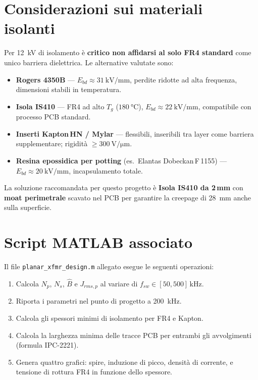 \documentclass[a4paper,11pt]{article}
\begin{document}
\section{Considerazioni sui materiali isolanti}

Per \SI{12}{\kilo\volt} di isolamento è \textbf{critico non affidarsi al solo FR4
standard} come unico barriera dielettrica. Le alternative valutate sono:

\begin{itemize}
  \item \textbf{Rogers 4350B} — $E_{bd} \approx \SI{31}{\kilo\volt\per\milli\metre}$,
        perdite ridotte ad alta frequenza, dimensioni stabili in temperatura.
  \item \textbf{Isola IS410} — FR4 ad alto $T_g$ ($\SI{180}{\celsius}$),
        $E_{bd} \approx \SI{22}{\kilo\volt\per\milli\metre}$, compatibile
        con processo PCB standard.
  \item \textbf{Inserti Kapton\,HN / Mylar} — flessibili, inseribili tra layer
        come barriera supplementare; rigidità $\geq \SI{300}{\volt\per\micro\metre}$.
  \item \textbf{Resina epossidica per potting} (es.\ Elantas Dobeckan\,F\,1155) —
        $E_{bd} \approx \SI{20}{\kilo\volt\per\milli\metre}$, incapsulamento totale.
\end{itemize}

La soluzione raccomandata per questo progetto è \textbf{Isola IS410 da 2\,mm}
con \textbf{moat perimetrale} scavato nel PCB per garantire la creepage di
\SI{28}{\milli\metre} anche sulla superficie.

\section{Script MATLAB associato}

Il file \texttt{planar\_xfmr\_design.m} allegato esegue le seguenti operazioni:
\begin{enumerate}
  \item Calcola $N_p$, $N_s$, $\hat{B}$ e $J_{rms,p}$ al variare di
        $f_{sw} \in [50, 500]\,\mathrm{kHz}$.
  \item Riporta i parametri nel punto di progetto a \SI{200}{\kilo\hertz}.
  \item Calcola gli spessori minimi di isolamento per FR4 e Kapton.
  \item Calcola la larghezza minima delle tracce PCB per entrambi gli
        avvolgimenti (formula IPC-2221).
  \item Genera quattro grafici: spire, induzione di picco, densità di corrente,
        e tensione di rottura FR4 in funzione dello spessore.
\end{enumerate}
\end{document}
